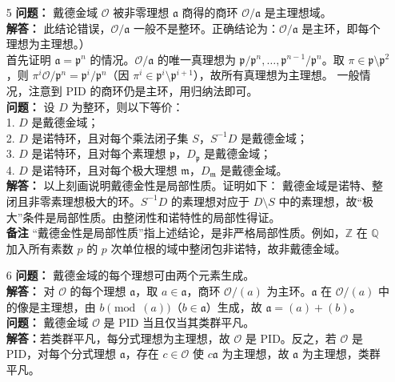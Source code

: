 \documentclass[UTF8]{ctexart}
\begin{document}
\begin{enumerate}
\begin{enumerate}
\item[5]
\textbf{问题：} 戴德金域 \(\mathcal{O}\) 被非零理想 \(\mathfrak{a}\) 商得的商环 \(\mathcal{O} / \mathfrak{a}\) 是主理想域。\\
\textbf{解答：} 此结论错误，\(\mathcal{O} / \mathfrak{a}\) 一般不是整环。正确结论为：\(\mathcal{O} / \mathfrak{a}\) 是主环，即每个理想为主理想。）\\
首先证明 \(\mathfrak{a} = \mathfrak{p}^n\) 的情况。\(\mathcal{O} / \mathfrak{a}\) 的唯一真理想为 \(\mathfrak{p} / \mathfrak{p}^n, \dots, \mathfrak{p}^{n-1} / \mathfrak{p}^n\)。取 \(\pi \in \mathfrak{p} \setminus \mathfrak{p}^2\)，则 \(\pi^i \mathcal{O} / \mathfrak{p}^n = \mathfrak{p}^i / \mathfrak{p}^n\)（因 \(\pi^i \in \mathfrak{p}^i \setminus \mathfrak{p}^{i+1}\)），故所有真理想为主理想。  
一般情况，注意到 PID 的商环仍是主环，用归纳法即可。\\
\textbf{问题：} 设 \(D\) 为整环，则以下等价：\\
1. \(D\) 是戴德金域；\\
2. \(D\) 是诺特环，且对每个乘法闭子集 \(S\)，\(S^{-1} D\) 是戴德金域；\\
3. \(D\) 是诺特环，且对每个素理想 \(\mathfrak{p}\)，\(D_\mathfrak{p}\) 是戴德金域；\\
4. \(D\) 是诺特环，且对每个极大理想 \(\mathfrak{m}\)，\(D_\mathfrak{m}\) 是戴德金域。\\
\textbf{解答：} 以上刻画说明戴德金性是局部性质。证明如下：
戴德金域是诺特、整闭且非零素理想极大的环。\(S^{-1} D\) 的素理想对应于 \(D \setminus S\) 中的素理想，故“极大”条件是局部性质。由整闭性和诺特性的局部性得证。\\
\textbf{备注} “戴德金性是局部性质”指上述结论，是非严格局部性质。例如，\(\mathbb{Z}\) 在 \(\mathbb{Q}\) 加入所有素数 \(p\) 的 \(p\) 次单位根的域中整闭包非诺特，故非戴德金域。

\item[6]
\textbf{问题：} 戴德金域的每个理想可由两个元素生成。\\
\textbf{解答：} 对 \(\mathcal{O}\) 的每个理想 \(\mathfrak{a}\)，取 \(a \in \mathfrak{a}\)，商环 \(\mathcal{O} / (a)\) 为主环。\(\mathfrak{a}\) 在 \(\mathcal{O} / (a)\) 中的像是主理想，由 \(b \pmod{(a)}\)（\(b \in \mathfrak{a}\)）生成，故 \(\mathfrak{a} = (a) + (b)\)。\\
\textbf{问题：} 戴德金域 \(\mathcal{O}\) 是 PID 当且仅当其类群平凡。\\
\textbf{解答：}若类群平凡，每分式理想为主理想，故 \(\mathcal{O}\) 是 PID。反之，若 \(\mathcal{O}\) 是 PID，对每个分式理想 \(\mathfrak{a}\)，存在 \(c \in \mathcal{O}\) 使 \(c \mathfrak{a}\) 为主理想，故 \(\mathfrak{a}\) 为主理想，类群平凡。


\end{enumerate}
\end{enumerate}
\end{document}
